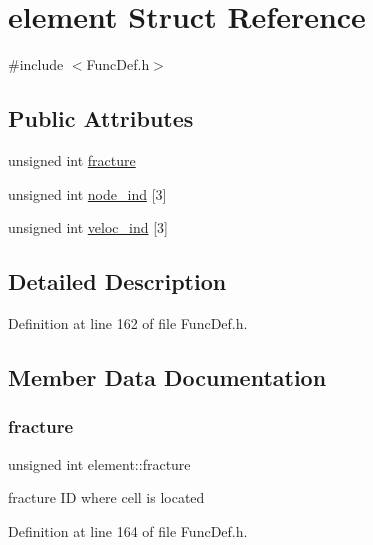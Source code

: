 \hypertarget{structelement}{}\section{element Struct Reference}
\label{structelement}


{\ttfamily \#include $<$Func\+Def.\+h$>$}

\subsection*{Public Attributes}
\begin{DoxyCompactItemize}
\item 
unsigned int \mbox{\hyperlink{structelement_af51b08146a1c495aadf45e7f085e1267}{fracture}}
\item 
unsigned int \mbox{\hyperlink{structelement_aadc95dc4817009223151c40387f40e06}{node\+\_\+ind}} \mbox{[}3\mbox{]}
\item 
unsigned int \mbox{\hyperlink{structelement_ab6062a713eca6e7458529ea45dea64d3}{veloc\+\_\+ind}} \mbox{[}3\mbox{]}
\end{DoxyCompactItemize}


\subsection{Detailed Description}


Definition at line 162 of file Func\+Def.\+h.



\subsection{Member Data Documentation}
\mbox{\label{structelement_af51b08146a1c495aadf45e7f085e1267}} 
\subsubsection{\texorpdfstring{fracture}{fracture}}
{\footnotesize\ttfamily unsigned int element\+::fracture}

fracture ID where cell is located 

Definition at line 164 of file Func\+Def.\+h.

\mbox{\label{structelement_aadc95dc4817009223151c40387f40e06}} 
